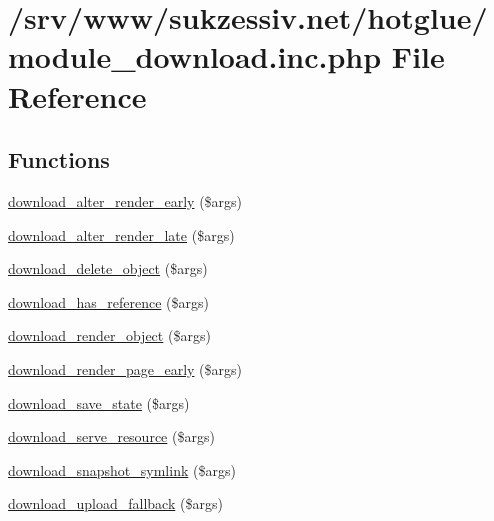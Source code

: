 \hypertarget{module__download_8inc_8php}{
\section{/srv/www/sukzessiv.net/hotglue/module\_\-download.inc.php File Reference}
\label{module__download_8inc_8php}
}
\subsection*{Functions}
\begin{DoxyCompactItemize}
\item 
\hyperlink{module__download_8inc_8php_a28d1b9ae20de8d1a271f15d308b1df31}{download\_\-alter\_\-render\_\-early} (\$args)
\item 
\hyperlink{module__download_8inc_8php_a61a6050abc43cf71d0ca422a9240ae7c}{download\_\-alter\_\-render\_\-late} (\$args)
\item 
\hyperlink{module__download_8inc_8php_a5fd781bf1e0393667b227abec7169b28}{download\_\-delete\_\-object} (\$args)
\item 
\hyperlink{module__download_8inc_8php_aa80da3f3fd41f7f00f97043f7a2431c8}{download\_\-has\_\-reference} (\$args)
\item 
\hyperlink{module__download_8inc_8php_a57c588f1fd0663aa16fd707a522bcc79}{download\_\-render\_\-object} (\$args)
\item 
\hyperlink{module__download_8inc_8php_ac980246bec838c65efd59bc25253b005}{download\_\-render\_\-page\_\-early} (\$args)
\item 
\hyperlink{module__download_8inc_8php_a2e9ee6868b80832b40e9072a8c644c88}{download\_\-save\_\-state} (\$args)
\item 
\hyperlink{module__download_8inc_8php_a930c9545346e8da3f3db5a97dc4d8c74}{download\_\-serve\_\-resource} (\$args)
\item 
\hyperlink{module__download_8inc_8php_ae1b136740fb3c1fe26820e1982f8d353}{download\_\-snapshot\_\-symlink} (\$args)
\item 
\hyperlink{module__download_8inc_8php_a678bcaf9018d772881b4291020894fa0}{download\_\-upload\_\-fallback} (\$args)
\end{DoxyCompactItemize}


